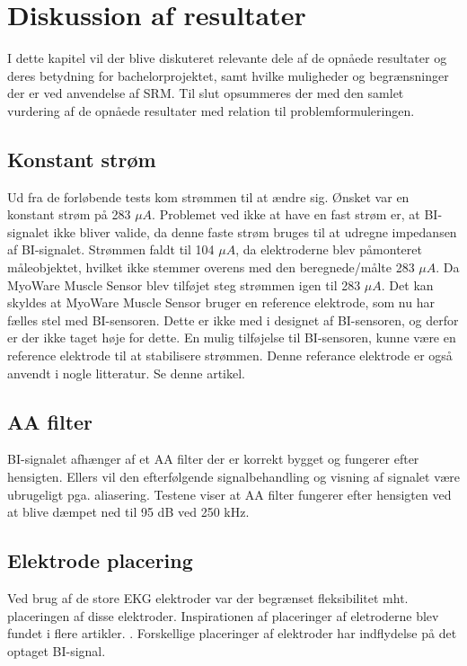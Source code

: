 \chapter{Diskussion af resultater}

I dette kapitel vil der blive diskuteret relevante dele af de opnåede resultater og deres betydning for bachelorprojektet, samt hvilke muligheder og begrænsninger der er ved anvendelse af SRM. Til slut opsummeres der med den samlet vurdering af de opnåede resultater med relation til problemformuleringen.

\section{Konstant strøm}
Ud fra de forløbende tests kom strømmen til at ændre sig. Ønsket var en konstant strøm på 283 $\mu A$. Problemet ved ikke at have en fast strøm er, at BI-signalet ikke bliver valide, da denne faste strøm bruges til at udregne impedansen af BI-signalet. Strømmen faldt til 104 $\mu A$, da elektroderne blev påmonteret måleobjektet, hvilket ikke stemmer overens med den beregnede/målte 283 $\mu A$. Da MyoWare Muscle Sensor blev tilføjet steg strømmen igen til 283 $\mu A$. Det kan skyldes at MyoWare Muscle Sensor bruger en reference elektrode, som nu har fælles stel med BI-sensoren. Dette er ikke med i designet af BI-sensoren, og derfor er der ikke taget høje for dette. En mulig tilføjelse til BI-sensoren, kunne være en reference elektrode til at stabilisere strømmen. Denne referance elektrode er også anvendt i nogle litteratur. Se denne artikel\cite{Nahrstaedt2012a}. 

\section{AA filter}
BI-signalet afhænger af et AA filter der er korrekt bygget og fungerer efter hensigten. Ellers vil den efterfølgende signalbehandling og visning af signalet være ubrugeligt pga. aliasering. Testene viser at AA filter fungerer efter hensigten ved at blive dæmpet ned til 95 dB ved 250 kHz. 


\section{Elektrode placering}
Ved brug af de store EKG elektroder var der begrænset fleksibilitet mht. placeringen af disse elektroder. Inspirationen af placeringer af eletroderne blev fundet i flere artikler.\cite{Chester}
\cite{Schultheiss2013}. Forskellige placeringer af elektroder har indflydelse på det optaget BI-signal\cite{Yamamoto2000}.  



